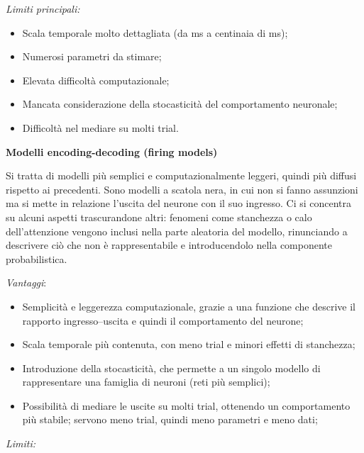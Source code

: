\documentclass[12pt,a4paper,openany]{book}
\begin{document}
\textit{Limiti principali:}

\begin{itemize}
  \item Scala temporale molto dettagliata (da ms a centinaia di ms);
  \item Numerosi parametri da stimare;
  \item Elevata difficoltà computazionale;
  \item Mancata considerazione della stocasticità del comportamento neuronale;
  \item Difficoltà nel mediare su molti trial.
\end{itemize}
\textbf{Modelli encoding-decoding (firing models)}

Si tratta di modelli più semplici e computazionalmente leggeri, quindi più diffusi rispetto ai precedenti. Sono modelli a scatola nera, in cui non si fanno assunzioni ma si mette in relazione l'uscita del neurone con il suo ingresso. Ci si concentra su alcuni aspetti trascurandone altri: fenomeni come stanchezza o calo dell'attenzione vengono inclusi nella parte aleatoria del modello, rinunciando a descrivere ciò che non è rappresentabile e introducendolo nella componente probabilistica.

\textit{Vantaggi}:

\begin{itemize}
  \item Semplicità e leggerezza computazionale, grazie a una funzione che descrive il rapporto ingresso--uscita e quindi il comportamento del neurone;
  \item Scala temporale più contenuta, con meno trial e minori effetti di stanchezza;
  \item Introduzione della stocasticità, che permette a un singolo modello di rappresentare una famiglia di neuroni (reti più semplici);
  \item Possibilità di mediare le uscite su molti trial, ottenendo un comportamento più stabile; servono meno trial, quindi meno parametri e meno dati;
\end{itemize}
\textit{Limiti:}
\end{document}

